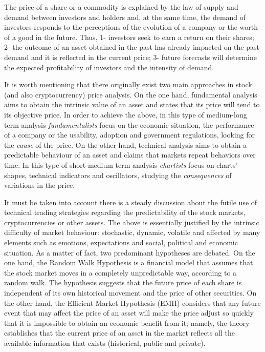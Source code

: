 \documentclass[10pt,twocolumn,letterpaper]{article}
\begin{document}
The price of a share or a commodity is explained by the law of supply and demand between investors and holders and, at the same time, the demand of investors responds to the perceptions of the evolution of a company or the worth of a good in the future. Thus, 1- investors seek to earn a return on their shares; 2- the outcome of an asset obtained in the past has already impacted on the past demand and it is reflected in the current price; 3- future forecasts will determine the expected profitability of investors and the intensity of demand.

It is worth mentioning that there originally exist two main approaches in stock (and also cryptocurrency) price analysis. On the one hand, fundamental analysis aims to obtain the intrinsic value of an asset and states that its price will tend to its objective price. In order to achieve the above, in this type of medium-long term analysis \textit{fundamentalists} focus on the economic situation, the performance of a company or the usability, adoption and government regulations, \ie looking for the \textit{cause} of the price. On the other hand, technical analysis aims to obtain a predictable behaviour of an asset and claims that markets repeat behaviors over time. In this type of short-medium term analysis \textit{chartists} focus on charts’ shapes, technical indicators and oscillators, \ie studying the \textit{consequences} of variations in the price.

It must be taken into account there is a steady discussion about the futile use of technical trading strategies regarding the predictability of the stock markets, cryptocurrencies or other assets. The above is essentially justified by the intrinsic difficulty of market behaviour: stochastic, dynamic, volatile and affected by many elements such as emotions, expectations and social, political and economic situation. As a matter of fact, two predominant hypotheses are debated. On the one hand, the Random Walk Hypothesis \cite{random_walk} is a financial model that assumes that the stock market moves in a completely unpredictable way, according to a random walk. The hypothesis suggests that the future price of each share is independent of its own historical movement and the price of other securities. On the other hand, the Efficient-Market Hypothesis (EMH) \cite{efficient_market} considers that any future event that may affect the price of an asset will make the price adjust so quickly that it is impossible to obtain an economic benefit from it; namely, the theory establishes that the current price of an asset in the market reflects all the available information that exists (historical, public and private).
\end{document}
